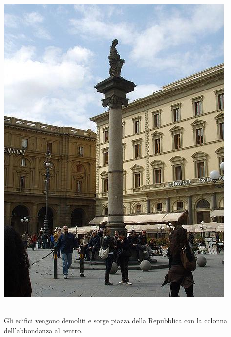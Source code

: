 \documentclass[a4paper,12pt, oneside]{book}
\begin{document}
\begin{center}
\begin{minipage}{0.42\linewidth}
  		\includegraphics[width=\linewidth]{"Immagini/colonna dell'abbondanza dopo"}
  		\label{fig:colonna dell'abbondanza dopo}
  	\end{minipage}
  \end{center}
  \leavevmode\\
  Gli edifici vengono demoliti e sorge piazza della Repubblica con la colonna dell'abbondanza al centro.\\
\end{document}
